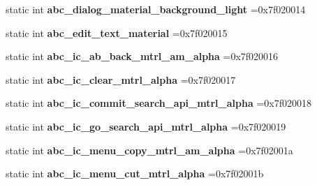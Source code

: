 \begin{DoxyCompactItemize}
static int {\bfseries abc\+\_\+dialog\+\_\+material\+\_\+background\+\_\+light} =0x7f020014
\item 
\mbox{\label{classandroid_1_1support_1_1v7_1_1mediarouter_1_1R_1_1drawable_a9099c058f57b680e1d08a29baace9688}} 
static int {\bfseries abc\+\_\+edit\+\_\+text\+\_\+material} =0x7f020015
\item 
\mbox{\label{classandroid_1_1support_1_1v7_1_1mediarouter_1_1R_1_1drawable_aa9dde01711e6a99a6ff6122ffb456b31}} 
static int {\bfseries abc\+\_\+ic\+\_\+ab\+\_\+back\+\_\+mtrl\+\_\+am\+\_\+alpha} =0x7f020016
\item 
\mbox{\label{classandroid_1_1support_1_1v7_1_1mediarouter_1_1R_1_1drawable_aaf9d703205ea0ef651c45de152a59333}} 
static int {\bfseries abc\+\_\+ic\+\_\+clear\+\_\+mtrl\+\_\+alpha} =0x7f020017
\item 
\mbox{\label{classandroid_1_1support_1_1v7_1_1mediarouter_1_1R_1_1drawable_a99216c723330531c240f69a01e5f52d6}} 
static int {\bfseries abc\+\_\+ic\+\_\+commit\+\_\+search\+\_\+api\+\_\+mtrl\+\_\+alpha} =0x7f020018
\item 
\mbox{\label{classandroid_1_1support_1_1v7_1_1mediarouter_1_1R_1_1drawable_a95ff082e1511691965943232b2a7ac5e}} 
static int {\bfseries abc\+\_\+ic\+\_\+go\+\_\+search\+\_\+api\+\_\+mtrl\+\_\+alpha} =0x7f020019
\item 
\mbox{\label{classandroid_1_1support_1_1v7_1_1mediarouter_1_1R_1_1drawable_ab406b71d5e832fdcd93809b1de7d342e}} 
static int {\bfseries abc\+\_\+ic\+\_\+menu\+\_\+copy\+\_\+mtrl\+\_\+am\+\_\+alpha} =0x7f02001a
\item 
\mbox{\label{classandroid_1_1support_1_1v7_1_1mediarouter_1_1R_1_1drawable_a7a770bd336c2778b9d6eb8d7c7101bac}} 
static int {\bfseries abc\+\_\+ic\+\_\+menu\+\_\+cut\+\_\+mtrl\+\_\+alpha} =0x7f02001b
\item 

\end{DoxyCompactItemize}
